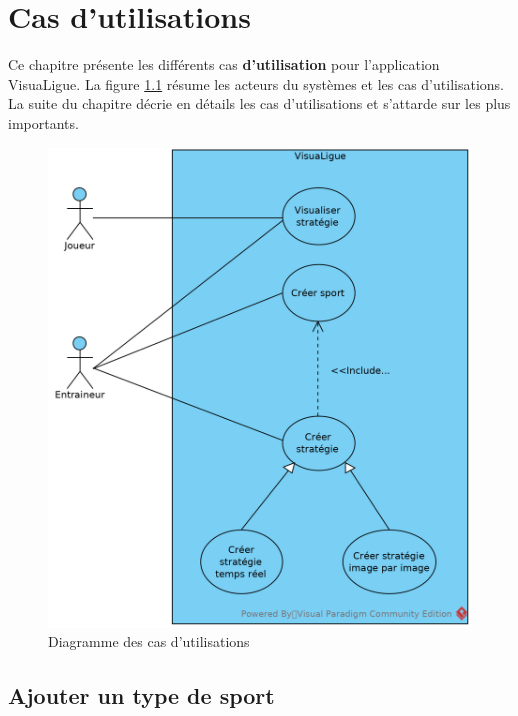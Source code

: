 
\chapter{Cas d'utilisations}
\label{s:cas_utilisation}

Ce chapitre présente les différents cas \textbf{d'utilisation} pour l'application VisuaLigue.
La figure \ref{fig:cas_utilisation_diag} résume les acteurs du systèmes et les cas d'utilisations.
La suite du chapitre décrie en détails les cas d'utilisations et s'attarde sur les plus importants.

\begin{figure}[htpb]
    \centering
    \includegraphics[scale=0.7]{fig/cas_utilisation_diag.png}
    \caption{Diagramme des cas d'utilisations}
    \label{fig:cas_utilisation_diag}
\end{figure}

\newpage

\section{Ajouter un type de sport}
\label{sec:ajouter_un_type_de_sport}

